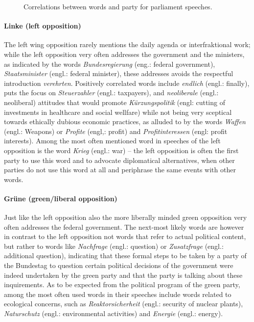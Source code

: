 \documentclass{article} %
\begin{document}
\begin{figure}
\begin{center}
%
\end{center}
\caption{
\label{fig:party_word_correlations}
Correlations between words and party for parliament speeches. }
\end{figure}

\paragraph{Linke (left opposition)} The left wing opposition rarely mentions the daily agenda or interfraktional work; while the left opposition very often addresses the government and the ministers, as indicated by the words {\em Bundesregierung} (eng.: federal government), {\em Staatsminister} (engl.: federal minister), these addresses avoids the respectful introduction {\em verehrten}. Positively correlated words include {\em endlich} (engl.: finally), puts the focus on {\em Steuerzahler} (engl.: taxpayers), and {\em neoliberale} (engl.: neoliberal) attitudes that would promote {\em K\"urzungspolitik} (engl: cutting of investments in healthcare and social wellfare) while not being very sceptical towards ethically dubious economic practices, as alluded to by the words {\em Waffen} (engl.: Weapons) or {\em Profite} (engl,: profit) and {\em Profitinteressen} (engl: profit interests). Among the most often mentioned word in speeches of the left opposition is the word {\em Krieg} (engl.: war) -- the left opposition is often the first party to use this word and to advocate diplomatical alternatives, when other parties do not use this word at all and periphrase the same events with other words. 

\paragraph{Gr\"une (green/liberal opposition)}
Just like the left opposition also the more liberally minded green opposition very often addresses the federal government. The next-most likely words are however in contrast to the left opposition not words that refer to actual political content, but rather to words like {\em Nachfrage} (engl.: question) or {\em Zusatzfrage} (engl.: additional question), indicating that these formal steps to be taken by a party of the Bundestag to question certain political decisions of the government were indeed undertaken by the green party and that the party is talking about these inquirements. As to be expected from the political program of the green party, among the most often used words in their speeches include words related to ecological concerns, such as {\em Reaktorsicherheit} (engl.: security of nuclear plants), {\em Naturschutz} (engl.: environmental activities) and {\em Energie} (engl.: energy). 
\end{document}
